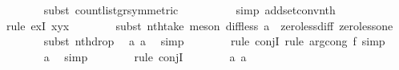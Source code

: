 \begin{isabellebody}
\ \ \ \ \ \ \isamarkupfalse%
\ {\isacharparenleft}{\kern0pt}subst\ count{\isacharunderscore}{\kern0pt}list{\isacharunderscore}{\kern0pt}gr{\isacharunderscore}{\kern0pt}{}{\isacharbrackleft}{\kern0pt}symmetric{\isacharbrackright}{\kern0pt}{\isacharparenright}{\kern0pt}\ \ \isanewline
\ \ \ \ \ \ \isamarkupfalse%
\ {\isacharparenleft}{\kern0pt}simp\ add{\isacharcolon}{\kern0pt}set{\isacharunderscore}{\kern0pt}conv{\isacharunderscore}{\kern0pt}nth{\isacharparenright}{\kern0pt}\isanewline
\ \ \ \ \ \ \isamarkupfalse%
\ {\isacharparenleft}{\kern0pt}rule\ exI{\isacharbrackleft}{\kern0pt}\ x{\isacharequal}{\kern0pt}{\isachardoublequoteopen}y{\isacharminus}{\kern0pt}x{\isacharminus}{\kern0pt}{}{\isachardoublequoteclose}{\isacharbrackright}{\kern0pt}{\isacharparenright}{\kern0pt}\isanewline
\ \ \ \ \ \ \isamarkupfalse%
\ {\isacharparenleft}{\kern0pt}subst\ nth{\isacharunderscore}{\kern0pt}take{\isacharcomma}{\kern0pt}\ meson\ diff{\isacharunderscore}{\kern0pt}less\ a{}{\isacharunderscore}{\kern0pt}{}\ \ zero{\isacharunderscore}{\kern0pt}less{\isacharunderscore}{\kern0pt}diff\ zero{\isacharunderscore}{\kern0pt}less{\isacharunderscore}{\kern0pt}one{\isacharparenright}{\kern0pt}\isanewline
\ \ \ \ \ \ \isamarkupfalse%
\ {\isacharparenleft}{\kern0pt}subst\ nth{\isacharunderscore}{\kern0pt}drop{\isacharparenright}{\kern0pt}\ \isamarkupfalse%
\ a{}{\isacharunderscore}{\kern0pt}{}\ a{}{\isacharunderscore}{\kern0pt}{}\ \isamarkupfalse%
\ simp\isanewline
\ \ \ \ \ \ \isamarkupfalse%
\ {\isacharparenleft}{\kern0pt}rule\ conjI{\isacharcomma}{\kern0pt}\ rule\ arg{\isacharunderscore}{\kern0pt}cong{}{\isacharbrackleft}{\kern0pt}\ f{\isacharequal}{\kern0pt}{\isachardoublequoteopen}{\isacharparenleft}{\kern0pt}{\isacharbang}{\kern0pt}{\isacharparenright}{\kern0pt}{\isachardoublequoteclose}{\isacharbrackright}{\kern0pt}{\isacharcomma}{\kern0pt}\ simp{\isacharparenright}{\kern0pt}\isanewline
\ \ \ \ \ \ \isamarkupfalse%
\ a{}{\isacharunderscore}{\kern0pt}{}\ \isamarkupfalse%
\ simp\isanewline
\ \ \ \ \ \ \isamarkupfalse%
\ {\isacharparenleft}{\kern0pt}rule\ conjI{\isacharparenright}{\kern0pt}\isanewline
\ \ \ \ \ \ \isamarkupfalse%
\ a{}{\isacharunderscore}{\kern0pt}{}\ a{}{\isacharunderscore}{\kern0pt}{}\ \isamarkupfalse%

\end{isabellebody}
